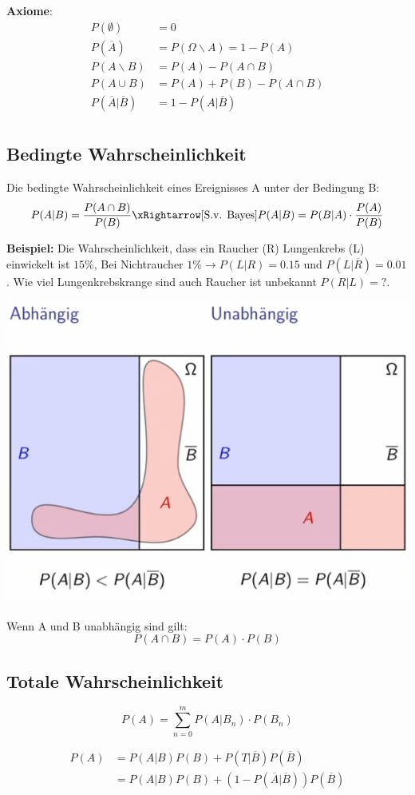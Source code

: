 \textbf{Axiome}:\\
\begin{align*}
	P(\emptyset) &= 0 \\
	P(\overline{A}) &= P(\Omega \backslash A) = 1 - P(A) \\
	P(A \backslash B) &= P(A) - P(A \cap B) \\
	P(A \cup B) &= P(A)  + P(B) - P(A \cap B) \\
	P(\overline{A} | \overline{B}) &= 1-P(A|\overline{B}) \\
\end{align*}

\subsection{Bedingte Wahrscheinlichkeit}
Die bedingte Wahrscheinlichkeit eines Ereignisses A unter der Bedingung B:
\[
P(A|B) = \frac{P(A \cap B)}{P(B)} \xRightarrow[\text{S.v. Bayes}]{} P(A|B) = P(B|A)\cdot\frac{P(A)}{P(B)}
\]

\noindent\textbf{Beispiel:} Die Wahrscheinlichkeit, dass ein Raucher (R) Lungenkrebs (L) einwickelt ist $15\%$, Bei Nichtraucher $1\% \rightarrow P(L|R) = 0.15$ und $P(L|\overline{R}) = 0.01$. Wie viel Lungenkrebskrange sind auch Raucher ist unbekannt $P(R|L) = ?$.

\begin{center}
	\includegraphics[width=0.5\columnwidth]{Images/bedingte_wahr.}
\end{center}

\noindent Wenn A und B unabhängig sind gilt:
\[ P(A \cap B) = P(A) \cdot P(B)\]


\subsection{Totale Wahrscheinlichkeit}
\[
P(A) = \sum_{n=0}^{m}P(A|B_n)\cdot P(B_n)
\]

\begin{align*}
	P(A) &=P(A|B)P(B) + P(T|\overline{B})P(\overline{B}) \\
	&= P(A|B)P(B) + (1 - P(\overline{A}|\overline{B}))P(\overline{B})
\end{align*}


